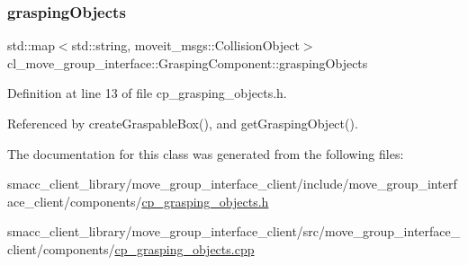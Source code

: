\subsubsection{\texorpdfstring{grasping\+Objects}{graspingObjects}}
{\footnotesize\ttfamily std\+::map$<$std\+::string, moveit\+\_\+msgs\+::\+Collision\+Object$>$ cl\+\_\+move\+\_\+group\+\_\+interface\+::\+Grasping\+Component\+::grasping\+Objects\hspace{0.3cm}{\ttfamily [private]}}



Definition at line 13 of file cp\+\_\+grasping\+\_\+objects.\+h.



Referenced by create\+Graspable\+Box(), and get\+Grasping\+Object().



The documentation for this class was generated from the following files\+:\begin{DoxyCompactItemize}
\item 
smacc\+\_\+client\+\_\+library/move\+\_\+group\+\_\+interface\+\_\+client/include/move\+\_\+group\+\_\+interface\+\_\+client/components/\hyperlink{cp__grasping__objects_8h}{cp\+\_\+grasping\+\_\+objects.\+h}\item 
smacc\+\_\+client\+\_\+library/move\+\_\+group\+\_\+interface\+\_\+client/src/move\+\_\+group\+\_\+interface\+\_\+client/components/\hyperlink{cp__grasping__objects_8cpp}{cp\+\_\+grasping\+\_\+objects.\+cpp}\end{DoxyCompactItemize}

